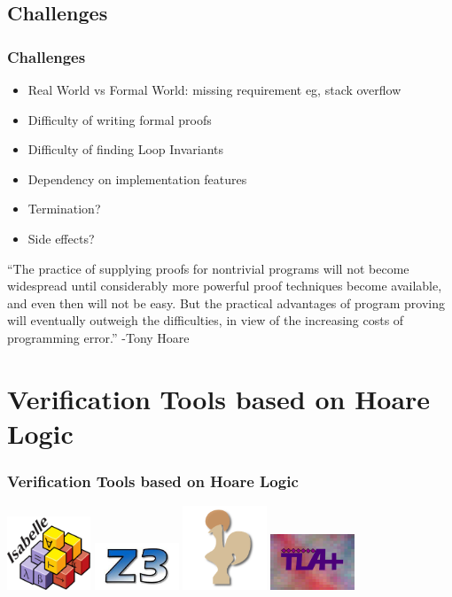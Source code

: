 \documentclass{beamer}
\begin{document}
\subsection{Challenges}
\begin{frame}
        \frametitle{Challenges}
	\begin{itemize}
		\item Real World vs Formal World: missing requirement eg, stack overflow
		\item Difficulty of writing formal proofs 
		\item Difficulty of finding Loop Invariants 
		\item Dependency on implementation features
		\item Termination?
		\item Side effects?
         \end{itemize} 
	\pause
	“The practice of supplying proofs for nontrivial programs will not become widespread until
considerably more powerful proof techniques become available, and even then will not be
easy. But the practical advantages of program proving will eventually outweigh the difficulties,
in view of the increasing costs of programming error.” -Tony Hoare
	\end{frame}

\section{Verification Tools based on Hoare Logic}
\begin{frame}
        \frametitle{Verification Tools based on Hoare Logic}
	\center
	\includegraphics[width=25mm] {isabelle}
\hspace{15mm}
	\includegraphics[width=25mm] {Z3.jpeg}
	\newline
	\vspace {20mm}
        \includegraphics [width=25mm] {coq}
	\hspace{15mm}
	\includegraphics [width=25mm] {TLA+}


\end{frame}
\end{document}
